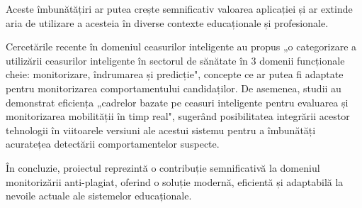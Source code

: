 \documentclass[12pt,a4paper]{article}
\begin{document}
Aceste îmbunătățiri ar putea crește semnificativ valoarea aplicației și ar extinde aria de utilizare a acesteia în diverse contexte educaționale și profesionale.

Cercetările recente în domeniul ceasurilor inteligente au propus „o categorizare a utilizării ceasurilor 
inteligente în sectorul de sănătate în 3 domenii funcționale cheie: monitorizare, îndrumarea și 
predicție"\cite{moshawrab2023value}, concepte ce ar putea fi adaptate pentru monitorizarea 
comportamentului candidaților. De asemenea, studii au demonstrat eficiența „cadrelor bazate pe ceasuri 
inteligente pentru evaluarea și monitorizarea mobilității în timp real"\cite{kheirkhahan2018smartwatch}, 
sugerând posibilitatea integrării acestor tehnologii în viitoarele versiuni ale acestui sistemu pentru 
a îmbunătăți acuratețea detectării comportamentelor suspecte. \cite{brainard2018massive}

În concluzie, proiectul reprezintă o contribuție semnificativă la domeniul monitorizării anti-plagiat, oferind o soluție modernă, eficientă și adaptabilă la nevoile actuale ale sistemelor educaționale.

\newpage
\printbibliography[heading=bibintoc, title={Bibliografie}]
\end{document}
